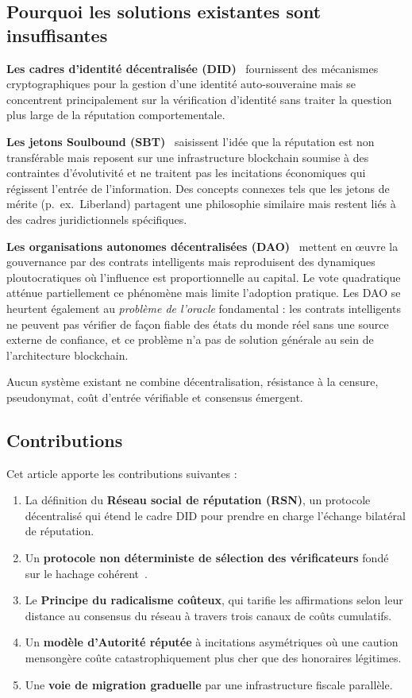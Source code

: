 \documentclass[11pt,a4paper,twocolumn]{article}
\begin{document}
\subsection{Pourquoi les solutions existantes sont insuffisantes}

\textbf{Les cadres d'identité décentralisée (DID)}~\cite{did2022} fournissent des mécanismes cryptographiques pour la gestion d'une identité auto-souveraine mais se concentrent principalement sur la vérification d'identité sans traiter la question plus large de la réputation comportementale.

\textbf{Les jetons Soulbound (SBT)}~\cite{weyl2022} saisissent l'idée que la réputation est non transférable mais reposent sur une infrastructure blockchain soumise à des contraintes d'évolutivité et ne traitent pas les incitations économiques qui régissent l'entrée de l'information. Des concepts connexes tels que les jetons de mérite (p.\ ex.\ Liberland) partagent une philosophie similaire mais restent liés à des cadres juridictionnels spécifiques.

\textbf{Les organisations autonomes décentralisées (DAO)}~\cite{buterin2014} mettent en œuvre la gouvernance par des contrats intelligents mais reproduisent des dynamiques ploutocratiques où l'influence est proportionnelle au capital. Le vote quadratique~\cite{buterin2019} atténue partiellement ce phénomène mais limite l'adoption pratique. Les DAO se heurtent également au \emph{problème de l'oracle} fondamental : les contrats intelligents ne peuvent pas vérifier de façon fiable des états du monde réel sans une source externe de confiance, et ce problème n'a pas de solution générale au sein de l'architecture blockchain.

Aucun système existant ne combine décentralisation, résistance à la censure, pseudonymat, coût d'entrée vérifiable et consensus émergent.

\subsection{Contributions}

Cet article apporte les contributions suivantes :
\begin{enumerate}[nosep]
\item La définition du \textbf{Réseau social de réputation (RSN)}, un protocole décentralisé qui étend le cadre DID pour prendre en charge l'échange bilatéral de réputation.
\item Un \textbf{protocole non déterministe de sélection des vérificateurs} fondé sur le hachage cohérent~\cite{karger1997}.
\item Le \textbf{Principe du radicalisme coûteux}, qui tarifie les affirmations selon leur distance au consensus du réseau à travers trois canaux de coûts cumulatifs.
\item Un \textbf{modèle d'Autorité réputée} à incitations asymétriques où une caution mensongère coûte catastrophiquement plus cher que des honoraires légitimes.
\item Une \textbf{voie de migration graduelle} par une infrastructure fiscale parallèle.
\end{enumerate}
\end{document}
